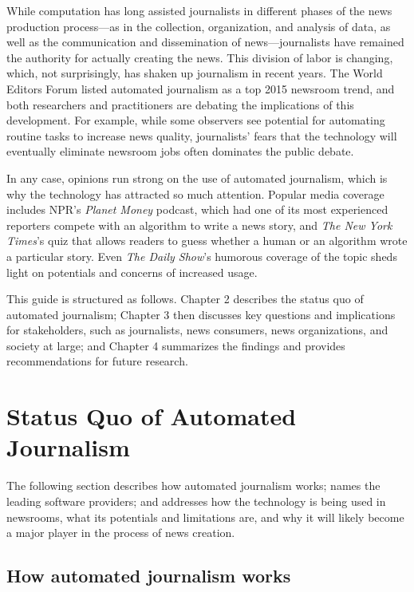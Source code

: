 \documentclass[notoc, symmetric, nobib, nols]{towcenter-guideto-book}
\begin{document}
While computation has long assisted journalists in different phases of the news production process---as in the collection, organization, and analysis of data, as well as the communication and dissemination of news---journalists have remained the authority for actually creating the news. This division of labor is changing, which, not surprisingly, has shaken up journalism in recent years. The World Editors Forum listed automated journalism as a top 2015 newsroom trend,\autocite{ap15} and both researchers and practitioners are debating the implications of this development.\autocites{napoli14,diak15,anderson13} For example, while some observers see potential for automating routine tasks to increase news quality, journalists' fears that the technology will eventually eliminate newsroom jobs often dominates the public debate.\autocite{dalen12,carlson15}  

In any case, opinions run strong on the use of automated journalism, which is why the technology has attracted so much attention. Popular media coverage includes NPR's \textit{Planet Money} podcast, which had one of its most experienced reporters compete with an algorithm to write a news story,\autocite{vs15} and \textit{The New York Times}'s quiz that allows readers to guess whether a human or an algorithm wrote a particular story.\autocite{nyt15} Even \textit{The Daily Show}'s humorous coverage of the topic sheds light on potentials and concerns of increased usage\autocite{daily15}.

This guide is structured as follows. Chapter 2 describes the status quo of automated journalism; Chapter 3 then discusses key questions and implications for stakeholders, such as journalists, news consumers, news organizations, and society at large; and Chapter 4 summarizes the findings and provides recommendations for future research.
 
\chapter{Status Quo of Automated Journalism}

The following section describes how automated journalism works; names the leading software providers; and addresses how the technology is being used in newsrooms, what its potentials and limitations are, and why it will likely become a major player in the process of news creation.

\section{How automated journalism works}
\end{document}
